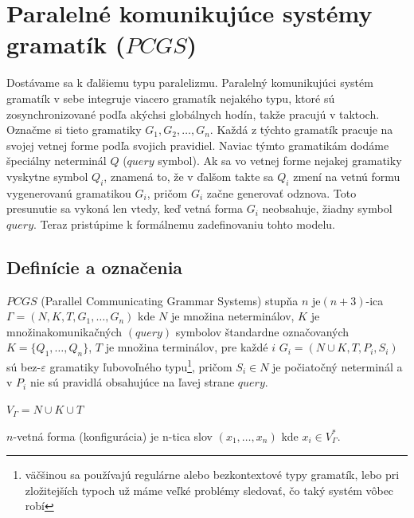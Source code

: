 \chapter{Paralelné komunikujúce systémy gramatík ($PCGS$)}

Dostávame sa k ďalšiemu typu paralelizmu. Paralelný komunikujúci
systém gramatík v sebe integruje viacero gramatík nejakého typu,
ktoré sú zosynchronizované podľa akýchsi globálnych hodín, takže
pracujú v taktoch. Označme si tieto gramatiky $G_1,G_2,\dots
,G_n$. Každá z týchto gramatík pracuje na svojej vetnej forme
podľa svojich pravidiel. Naviac týmto gramatikám dodáme špeciálny
neterminál $Q$ ($query$ symbol). Ak sa vo vetnej forme nejakej
gramatiky vyskytne symbol $Q_i$, znamená to, že v ďalšom takte sa
$Q_i$ zmení na vetnú formu vygenerovanú gramatikou $G_i$, pričom
$G_i$ začne generovať odznova. Toto presunutie sa vykoná len
vtedy, keď vetná forma $G_i$ neobsahuje, žiadny symbol $query$.
Teraz pristúpime k formálnemu zadefinovaniu tohto modelu.

\section{Definície a označenia}

\begin{definicia}
$PCGS$ (Parallel Communicating Grammar Systems) stupňa $n$
je\newline $(n+3)$-ica $\Gamma =(N,K,T,G_1,\dots ,G_n)$ kde $N$ je
množina neterminálov, $K$ je množina\linebreak komunikačných
\mbox{$(query)$} symbolov štandardne označovaných $K=\{Q_1,\dots
,Q_n\}$, $T$ je množina terminálov, pre každé $i$ $G_i=(N\cup
K,T,P_i,S_i)$ sú bez-$\varepsilon$ gramatiky ľubovoľného
typu\footnote{väčšinou sa používajú regulárne alebo bezkontextové
typy gramatík, lebo pri zložitejších typoch už máme veľké problémy
sledovať, čo taký systém vôbec robí}, pričom $S_i\in N$ je
počiatočný neterminál a v $P_i$ nie sú pravidlá obsahujúce na
ľavej strane $query$.
\end{definicia}

\begin{oznacenie}
$V_\Gamma=N\cup K\cup T$
\end{oznacenie}

\begin{definicia}
$n$-vetná forma (konfigurácia) je n-tica slov $(x_1,\dots ,x_n)$
kde $x_i\in V_\Gamma^*$.
\end{definicia}

